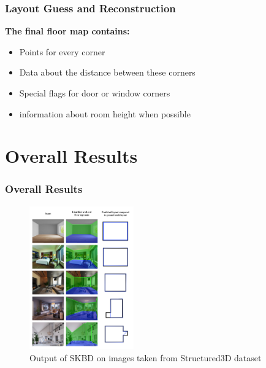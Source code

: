 \documentclass{beamer}
\begin{document}
\begin{frame}
\frametitle{Layout Guess and Reconstruction}
\textbf{The final floor map contains:}
\begin{itemize}
    \item Points for every corner
    \item Data about the distance between these corners
    \item Special flags for door or window corners
    \item information about room height when possible
\end{itemize}
\end{frame}


\section{Overall Results}
\begin{frame}
\frametitle{Overall Results}
\begin{figure}[htbp]
\centering
    \includegraphics[width=0.4\textwidth]{images/results2.png}
    \caption{Output of SKBD on images taken from Structured3D dataset}
    \label{fig:overall_results}
\end{figure}
\end{frame}
\end{document}
